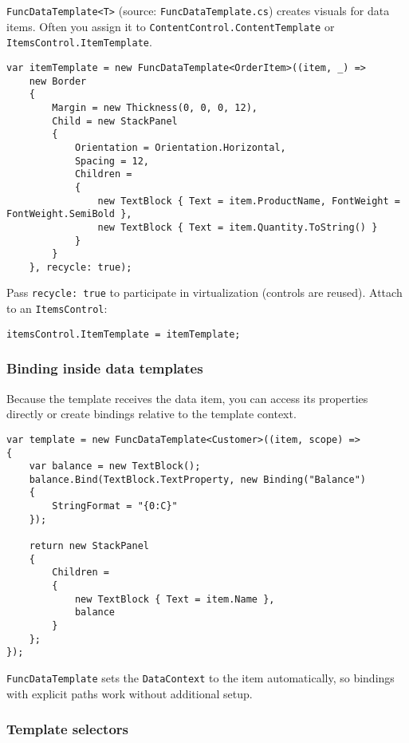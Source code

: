 \passthrough{\lstinline!FuncDataTemplate<T>!} (source:
\passthrough{\lstinline!FuncDataTemplate.cs!}) creates visuals for data
items. Often you assign it to
\passthrough{\lstinline!ContentControl.ContentTemplate!} or
\passthrough{\lstinline!ItemsControl.ItemTemplate!}.

\begin{lstlisting}
var itemTemplate = new FuncDataTemplate<OrderItem>((item, _) =>
    new Border
    {
        Margin = new Thickness(0, 0, 0, 12),
        Child = new StackPanel
        {
            Orientation = Orientation.Horizontal,
            Spacing = 12,
            Children =
            {
                new TextBlock { Text = item.ProductName, FontWeight = FontWeight.SemiBold },
                new TextBlock { Text = item.Quantity.ToString() }
            }
        }
    }, recycle: true);
\end{lstlisting}

Pass \passthrough{\lstinline!recycle: true!} to participate in
virtualization (controls are reused). Attach to an
\passthrough{\lstinline!ItemsControl!}:

\begin{lstlisting}
itemsControl.ItemTemplate = itemTemplate;
\end{lstlisting}

\subsubsection{Binding inside data
templates}\label{binding-inside-data-templates}

Because the template receives the data item, you can access its
properties directly or create bindings relative to the template context.

\begin{lstlisting}
var template = new FuncDataTemplate<Customer>((item, scope) =>
{
    var balance = new TextBlock();
    balance.Bind(TextBlock.TextProperty, new Binding("Balance")
    {
        StringFormat = "{0:C}"
    });

    return new StackPanel
    {
        Children =
        {
            new TextBlock { Text = item.Name },
            balance
        }
    };
});
\end{lstlisting}

\passthrough{\lstinline!FuncDataTemplate!} sets the
\passthrough{\lstinline!DataContext!} to the item automatically, so
bindings with explicit paths work without additional setup.

\subsubsection{Template selectors}\label{template-selectors}

